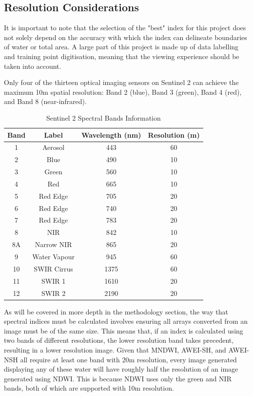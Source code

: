 \subsection{Resolution Considerations}
It is important to note that the selection of the "best" index for this project does not solely depend on the accuracy with which the index can delineate boundaries of water or total area. A large part of this project is made up of data labelling and training point digitisation, meaning that the viewing experience should be taken into account. 

Only four of the thirteen optical imaging sensors on Sentinel 2 can achieve the maximum 10m spatial resolution: Band 2 (blue), Band 3 (green), Band 4 (red), and Band 8 (near-infrared). 

\begin{table}[ht]
\centering
\begin{tabular}{|c|c|c|c|}
\hline
\textbf{Band} & \textbf{Label} & \textbf{Wavelength (nm)} & \textbf{Resolution (m)} \\
\hline
1 & Aerosol & 443 & 60 \\
\rowcolor{yellow} 2 & Blue & 490 & 10 \\
\rowcolor{yellow} 3 & Green & 560 & 10 \\
\rowcolor{yellow} 4 & Red & 665 & 10 \\
5 & Red Edge & 705 & 20 \\
6 & Red Edge & 740 & 20 \\
7 & Red Edge & 783 & 20 \\
\rowcolor{yellow} 8 & NIR & 842 & 10 \\
8A & Narrow NIR & 865 & 20 \\
9 & Water Vapour & 945 & 60 \\
10 & SWIR Cirrus & 1375 & 60 \\
11 & SWIR 1 & 1610 & 20 \\
12 & SWIR 2 & 2190 & 20 \\
\hline
\end{tabular}
\caption{Sentinel 2 Spectral Bands Information \citep{sinergise_2025}}
\end{table}

As will be covered in more depth in the methodology section, the way that spectral indices must be calculated involves ensuring all arrays converted from an image must be of the same size. This means that, if an index is calculated using two bands of different resolutions, the lower resolution band takes precedent, resulting in a lower resolution image. Given that MNDWI, AWEI-SH, and AWEI-NSH all require at least one band with 20m resolution, every image generated displaying any of these water will have roughly half the resolution of an image generated using NDWI. This is because NDWI uses only the green and NIR bands, both of which are supported with 10m resolution. 

